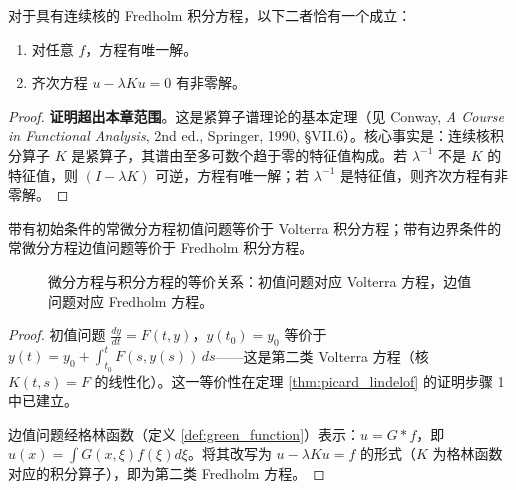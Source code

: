 \begin{theorem}\label{thm:fredholm_alternative}
对于具有连续核的 Fredholm 积分方程，以下二者恰有一个成立：
\begin{enumerate}[label=(\roman*)]
    \item 对任意 $f$，方程有唯一解。
    \item 齐次方程 $u - \lambda Ku = 0$ 有非零解。
\end{enumerate}
\end{theorem}

\begin{proof}
\textbf{证明超出本章范围}。这是紧算子谱理论的基本定理（见 Conway, \textit{A Course in Functional Analysis}, 2nd ed., Springer, 1990, \S{}VII.6）。核心事实是：连续核积分算子 $K$ 是紧算子，其谱由至多可数个趋于零的特征值构成。若 $\lambda^{-1}$ 不是 $K$ 的特征值，则 $(I - \lambda K)$ 可逆，方程有唯一解；若 $\lambda^{-1}$ 是特征值，则齐次方程有非零解。
\end{proof}

\begin{proposition}[积分方程与微分方程的等价性]\label{prop:integral_differential_equivalence}
带有初始条件的常微分方程初值问题等价于 Volterra 积分方程；带有边界条件的常微分方程边值问题等价于 Fredholm 积分方程。
\end{proposition}

\begin{figure}[htbp]
\centering
{}
\caption{微分方程与积分方程的等价关系：初值问题对应 Volterra 方程，边值问题对应 Fredholm 方程。}
\label{fig:integral_differential_equivalence}
\end{figure}

\begin{proof}
初值问题 $\frac{dy}{dt} = F(t,y)$，$y(t_0) = y_0$ 等价于 $y(t) = y_0 + \int_{t_0}^t F(s, y(s))\,ds$——这是第二类 Volterra 方程（核 $K(t,s) = F$ 的线性化）。这一等价性在定理 \ref{thm:picard_lindelof} 的证明步骤 1 中已建立。

边值问题经格林函数（定义 \ref{def:green_function}）表示：$u = G * f$，即 $u(x) = \int G(x,\xi)f(\xi)d\xi$。将其改写为 $u - \lambda K u = f$ 的形式（$K$ 为格林函数对应的积分算子），即为第二类 Fredholm 方程。
\end{proof}

